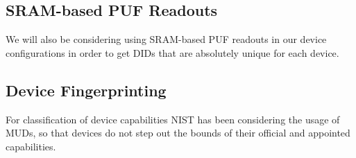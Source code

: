 \subsection{SRAM-based PUF Readouts} %
\label{sub:SRAM-based PUF Readouts}

We will also be considering using SRAM-based PUF readouts in our device configurations in order to get DIDs that are
absolutely unique for each device.

\cite{vinagrero2023sram}


\subsection{Device Fingerprinting} %
\label{sub:Device Fingerprinting}

For classification of device capabilities NIST has been considering the usage of MUDs, so that devices do not step out
the bounds of their official and appointed capabilities. \cite{dodson2021securing}

